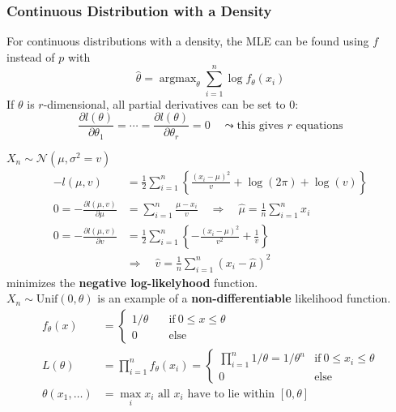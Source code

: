 \subsubsection{Continuous Distribution with a Density}
For continuous distributions with a density, the MLE can be found using $f$ instead of $p$ with
\noindent\begin{equation*}
    \hat{\theta}=\operatorname{argmax}_\theta\sum_{i=1}^n\log f_\theta(x_i)
\end{equation*}
If $\theta$ is $r$-dimensional, all partial derivatives can be set to 0:
\noindent\begin{equation*}
    \frac{\partial l(\theta)}{\partial\theta_1}=\cdots=\frac{\partial l(\theta)}{\partial\theta_r}=0\quad\leadsto\text{this gives }r\text{ equations}
\end{equation*}

\begin{examplesection}[Examples]
    $X_n\sim\mathcal{N}(\mu,\sigma^2=v)$
    \noindent\begin{align*}
        -l(\mu,v)                                & =\frac12\sum_{i=1}^n\left\{\frac{{(x_i-\mu)}^2}v+\log(2\pi)+\log(v)\right\}         \\
        0=-\frac{\partial l(\mu,v)}{\partial\mu} & =\sum_{i=1}^n\frac{\mu-x_i}v\quad\Rightarrow\quad \hat{\mu}=\frac1n\sum_{i=1}^n x_i \\
        0=-\frac{\partial l(\mu,v)}{\partial v}  & =\frac12\sum_{i=1}^n\left\{-\frac{{(x_i-\mu)}^2}{v^2}+\frac1v\right\}               \\
                                                 & \Rightarrow\quad\hat{v}=\frac1n\sum_{i=1}^n{(x_i-\hat{\mu})}^2
    \end{align*}
    minimizes the \textbf{negative log-likelyhood} function.\\
    $X_n\sim \mathrm{Unif}(0,\theta)$ is an example of a \textbf{non-differentiable} likelihood function.
    \noindent\begin{align*}
        f_\theta(x)        & =\begin{cases}
                                  1/\theta & \quad\mathrm{if~}0\leq x\leq\theta \\
                                  0        & \quad\mathrm{else}
                              \end{cases}                                                  \\
        L(\theta)          & =\prod_{i=1}^n f_\theta(x_i)=\begin{cases}
                                                              \prod_{i=1}^n1/\theta=1/\theta^n & \mathrm{if~}0\leq x_i\leq\theta \\
                                                              0                                & \mathrm{else}
                                                          \end{cases} \\
        \theta(x_1,\ldots) & =\max_i x_i \text{ all } x_i \text{ have to lie within } [0,\theta]
    \end{align*}
\end{examplesection}

